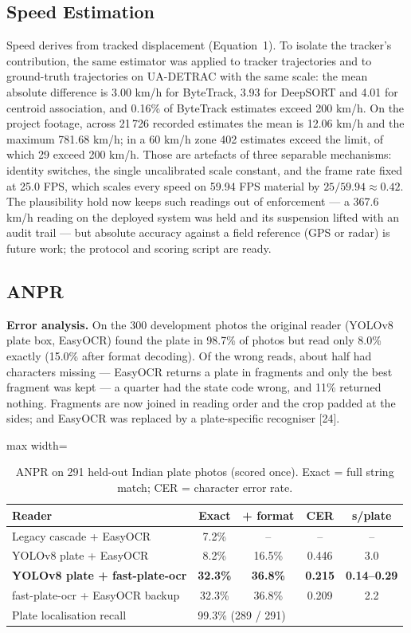 \documentclass[10pt,a4paper,twocolumn]{article}
\begin{document}
\subsection{Speed Estimation}
Speed derives from tracked displacement (Equation~1). To isolate the tracker's contribution, the same estimator was
applied to tracker trajectories and to ground-truth trajectories on UA-DETRAC with the same scale: the mean absolute
difference is 3.00 km/h for ByteTrack, 3.93 for DeepSORT and 4.01 for centroid association, and 0.16\% of ByteTrack
estimates exceed 200 km/h. On the project footage, across 21\,726 recorded estimates the mean is 12.06 km/h and the
maximum 781.68 km/h; in a 60 km/h zone 402 estimates exceed the limit, of which 29 exceed 200 km/h. Those are artefacts
of three separable mechanisms: identity switches, the single uncalibrated scale constant, and the frame rate fixed at
25.0 FPS, which scales every speed on 59.94 FPS material by $25/59.94\approx0.42$. The plausibility hold now keeps such
readings out of enforcement --- a 367.6 km/h reading on the deployed system was held and its suspension lifted with an
audit trail --- but absolute accuracy against a field reference (GPS or radar) is future work; the protocol and scoring
script are ready.

\subsection{ANPR}
\textbf{Error analysis.} On the 300 development photos the original reader (YOLOv8 plate box, EasyOCR) found the plate
in 98.7\% of photos but read only 8.0\% exactly (15.0\% after format decoding). Of the wrong reads, about half had
characters missing --- EasyOCR returns a plate in fragments and only the best fragment was kept --- a quarter had the
state code wrong, and 11\% returned nothing. Fragments are now joined in reading order and the crop padded at the
sides; and EasyOCR was replaced by a plate-specific recogniser [24].

\begin{table}[t]
\centering\scriptsize
\caption{ANPR on 291 held-out Indian plate photos (scored once). Exact = full string match; CER = character error rate.}\label{tab:anpr}
\setlength{\tabcolsep}{2.4pt}
\begin{adjustbox}{max width=\columnwidth}
\begin{tabular}{@{}lcccc@{}}
\toprule
Reader & Exact & + format & CER & s/plate\\
\midrule
Legacy cascade + EasyOCR & 7.2\% & -- & -- & --\\
YOLOv8 plate + EasyOCR & 8.2\% & 16.5\% & 0.446 & 3.0\\
\textbf{YOLOv8 plate + fast-plate-ocr} & \textbf{32.3\%} & \textbf{36.8\%} & \textbf{0.215} & \textbf{0.14--0.29}\\
fast-plate-ocr + EasyOCR backup & 32.3\% & 36.8\% & 0.209 & 2.2\\
\midrule
Plate localisation recall & \multicolumn{4}{l}{99.3\% (289 / 291)}\\
\bottomrule
\end{tabular}
\end{adjustbox}
\end{table}
\end{document}
